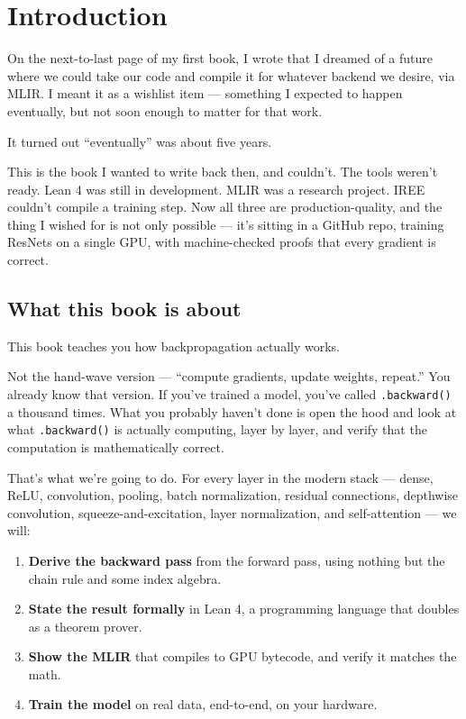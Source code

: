 %

\chapter{Introduction}
\label{chap:introduction}

On the next-to-last page of my first book, I wrote that I dreamed of a
future where we could take our code and compile it for whatever backend
we desire, via MLIR. I meant it as a wishlist item --- something I expected
to happen eventually, but not soon enough to matter for that work.

It turned out ``eventually'' was about five years.

This is the book I wanted to write back then, and couldn't. The tools
weren't ready. Lean 4 was still in development. MLIR was a research
project. IREE couldn't compile a training step. Now all three are
production-quality, and the thing I wished for is not only possible ---
it's sitting in a GitHub repo, training ResNets on a single GPU, with
machine-checked proofs that every gradient is correct.

\section*{What this book is about}

This book teaches you how backpropagation actually works.

Not the hand-wave version --- ``compute gradients, update weights,
repeat.'' You already know that version. If you've trained a model,
you've called \texttt{.backward()} a thousand times. What you probably
haven't done is open the hood and look at what \texttt{.backward()} is
actually computing, layer by layer, and verify that the computation
is mathematically correct.

That's what we're going to do. For every layer in the modern stack ---
dense, ReLU, convolution, pooling, batch normalization, residual
connections, depthwise convolution, squeeze-and-excitation, layer
normalization, and self-attention --- we will:

\begin{enumerate}
  \item \textbf{Derive the backward pass} from the forward pass, using nothing
    but the chain rule and some index algebra.
  \item \textbf{State the result formally} in Lean 4, a programming language
    that doubles as a theorem prover.
  \item \textbf{Show the MLIR} that compiles to GPU bytecode, and verify it
    matches the math.
  \item \textbf{Train the model} on real data, end-to-end, on your hardware.
\end{enumerate}

